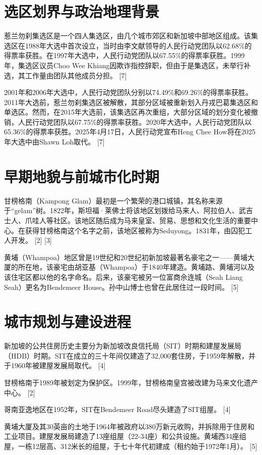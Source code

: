 \documentclass[11pt,a4paper,twoside,openany]{book}
\begin{document}
\section{选区划界与政治地理背景}
惹兰勿刹集选区是一个四人集选区，由几个城市郊区和新加坡中部地区组成。该集选区在1988年大选中首次设立，当时由李文献领导的人民行动党团队以62.68\%的得票率获胜。在1997年大选中，人民行动党团队以67.55\%的得票率获胜。1999年，集选区议员Choo Wee Khiang因欺诈指控辞职，但由于是集选区，未举行补选，其工作量由团队其他成员分担。 [7]

2001年和2006年大选中，人民行动党团队分别以74.49\%和69.26\%的得票率获胜。2011年大选前，惹兰勿刹集选区被解散，其部分区域被重新划入丹戎巴葛集选区和单选区。然而，在2015年大选前，该集选区再次重组，大部分区域的划分变化被撤销，人民行动党团队以67.75\%的得票率获胜。2020年大选中，人民行动党团队以65.36\%的得票率获胜。2025年4月17日，人民行动党宣布Heng Chee How将在2025年大选中由Shawn Loh取代。 [7]

\section{早期地貌与前城市化时期}
甘榜格南（Kampong Glam）最初是一个繁荣的港口城镇，其名称来源于“gelam”树。1822年，斯坦福·莱佛士将该地区划拨给马来人、阿拉伯人、武吉士人、爪哇人等社区。该地区随后成为马来皇室、贸易、思想和文化生活的重要中心。在获得甘榜格南这个名字之前，该地区被称为Seduyong。1831年，由囚犯工人开发。 [2] [3]

黄埔（Whampoa）地区曾是19世纪和20世纪初新加坡最著名豪宅之一——黄埔大厦的所在地，该豪宅由胡亚基（Whampoa）于1840年建造。黄埔路、黄埔河以及该住宅区都以他的名字命名。后来，该豪宅被另一位富商佘连城（Seah Liang Seah）更名为Bendemeer House。孙中山博士也曾在此居住过一段时间。 [5]

\section{城市规划与建设进程}
新加坡的公共住房历史主要分为新加坡改良信托局（SIT）时期和建屋发展局（HDB）时期。SIT在成立的三十年间仅建造了32,000套住房，于1959年解散，并于1960年被建屋发展局取代。 [4]

甘榜格南于1989年被划定为保护区。1999年，甘榜格南皇宫被改建为马来文化遗产中心。 [2]

哥南亚逸地区在1952年，SIT在Bendemeer Road尽头建造了SIT组屋。 [4]

黄埔大厦及其30英亩的土地于1964年被政府以380万新元收购，并拆除用于住房和工业项目。建屋发展局建造了13座组屋（22-34座）和公共设施。黄埔西34座组屋，一栋12层高、312米长的组屋，于七十年代初建成（租约始于1972年1月）。 [5]
\end{document}
